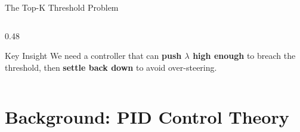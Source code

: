 \documentclass[aspectratio=169, 11pt]{beamer}
\begin{document}
\begin{frame}{The Top-K Threshold Problem}
\begin{columns}[T]
\begin{column}{0.48\textwidth}
\vspace{0.3em}
\begin{exampleblock}{Key Insight}
\small
We need a controller that can \textbf{push $\lambda$ high enough} to breach the threshold, then \textbf{settle back down} to avoid over-steering.
\end{exampleblock}
\end{column}
\end{columns}

\end{frame}

\section{Background: PID Control Theory}
\end{document}

